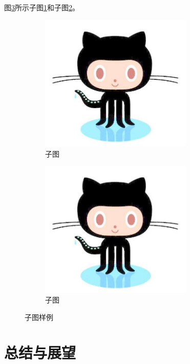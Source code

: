 \documentclass[winfonts,bachelor,twoside]{njuthesis}
\begin{document}
图\ref{fig:sub}所示子图\ref{subfig:a}和子图\ref{subfig:b}。
\begin{figure}[H]
	\begin{subfigure}{.5\textwidth}
		\centering
		\includegraphics[width=0.8\textwidth]{./figure/github.jpg}
		\caption{子图}
		\label{subfig:a}
	\end{subfigure}
	\begin{subfigure}{.5\textwidth}
		\centering
		\includegraphics[width=0.8\textwidth]{./figure/github.jpg}
		\caption{子图}
		\label{subfig:b}
	\end{subfigure}
\caption{子图样例}
\label{fig:sub}
\end{figure}

\chapter{总结与展望}
\lipsum[1]
\end{document}
